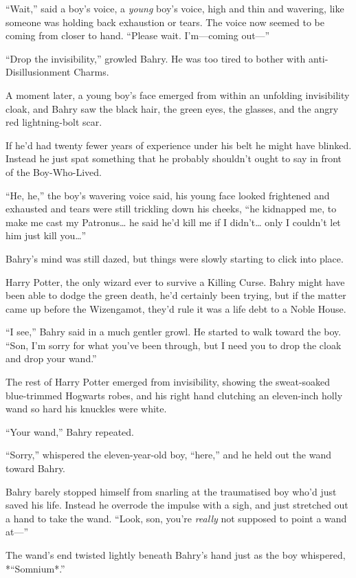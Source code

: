``Wait,'' said a boy's voice, a \emph{young} boy's voice, high and thin
and wavering, like someone was holding back exhaustion or tears. The
voice now seemed to be coming from closer to hand. ``Please wait.
I'm---coming out---''

``Drop the invisibility,'' growled Bahry. He was too tired to bother
with anti-Disillusionment Charms.

A moment later, a young boy's face emerged from within an unfolding
invisibility cloak, and Bahry saw the black hair, the green eyes, the
glasses, and the angry red lightning-bolt scar.

If he'd had twenty fewer years of experience under his belt he might
have blinked. Instead he just spat something that he probably shouldn't
ought to say in front of the Boy-Who-Lived.

``He, he,'' the boy's wavering voice said, his young face looked
frightened and exhausted and tears were still trickling down his cheeks,
``he kidnapped me, to make me cast my Patronus\ldots{} he said he'd kill
me if I didn't\ldots{} only I couldn't let him just kill you\ldots{}''

Bahry's mind was still dazed, but things were slowly starting to click
into place.

Harry Potter, the only wizard ever to survive a Killing Curse. Bahry
might have been able to dodge the green death, he'd certainly been
trying, but if the matter came up before the Wizengamot, they'd rule it
was a life debt to a Noble House.

``I see,'' Bahry said in a much gentler growl. He started to walk toward
the boy. ``Son, I'm sorry for what you've been through, but I need you
to drop the cloak and drop your wand.''

The rest of Harry Potter emerged from invisibility, showing the
sweat-soaked blue-trimmed Hogwarts robes, and his right hand clutching
an eleven-inch holly wand so hard his knuckles were white.

``Your wand,'' Bahry repeated.

``Sorry,'' whispered the eleven-year-old boy, ``here,'' and he held out
the wand toward Bahry.

Bahry barely stopped himself from snarling at the traumatised boy who'd
just saved his life. Instead he overrode the impulse with a sigh, and
just stretched out a hand to take the wand. ``Look, son, you're
\emph{really} not supposed to point a wand at---''

The wand's end twisted lightly beneath Bahry's hand just as the boy
whispered, *``Somnium*.''

